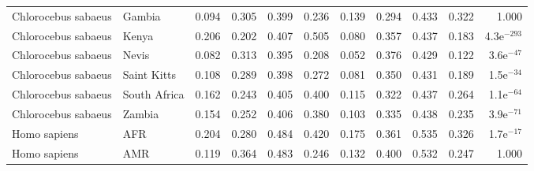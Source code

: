 \begin{longtable}{llrrrrrrrrr}
 Chlorocebus sabaeus &                    Gambia &                              0.094 &                               0.305 &                 0.399 &                 0.236 &                              0.139 &                               0.294 &                 0.433 &                 0.322 &         1.000 \\
 Chlorocebus sabaeus &                     Kenya &                              0.206 &                               0.202 &                 0.407 &                 0.505 &                              0.080 &                               0.357 &                 0.437 &                 0.183 & 4.3e$^{-293}$ \\
 Chlorocebus sabaeus &                     Nevis &                              0.082 &                               0.313 &                 0.395 &                 0.208 &                              0.052 &                               0.376 &                 0.429 &                 0.122 &  3.6e$^{-47}$ \\
 Chlorocebus sabaeus &               Saint Kitts &                              0.108 &                               0.289 &                 0.398 &                 0.272 &                              0.081 &                               0.350 &                 0.431 &                 0.189 &  1.5e$^{-34}$ \\
 Chlorocebus sabaeus &              South Africa &                              0.162 &                               0.243 &                 0.405 &                 0.400 &                              0.115 &                               0.322 &                 0.437 &                 0.264 &  1.1e$^{-64}$ \\
 Chlorocebus sabaeus &                    Zambia &                              0.154 &                               0.252 &                 0.406 &                 0.380 &                              0.103 &                               0.335 &                 0.438 &                 0.235 &  3.9e$^{-71}$ \\
        Homo sapiens &                       AFR &                              0.204 &                               0.280 &                 0.484 &                 0.420 &                              0.175 &                               0.361 &                 0.535 &                 0.326 &  1.7e$^{-17}$ \\
        Homo sapiens &                       AMR &                              0.119 &                               0.364 &                 0.483 &                 0.246 &                              0.132 &                               0.400 &                 0.532 &                 0.247 &         1.000 \\

\end{longtable}
